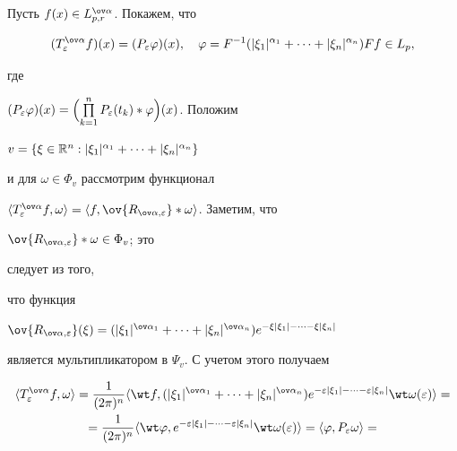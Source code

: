 \begin{pf}


Пусть $f(x)\in\spaceL$. Покажем, что


\begin{equation}


(T^{\ov\alpha}_\varepsilon f)(x)=(P_\varepsilon\varphi)(x),\quad


\varphi=F^{-1}(|\xi_1|^{\alpha_1}+\dotsb+|\xi_n|^{\alpha_n})


Ff\in L_p,


\end{equation}


где


$(P_\varepsilon\varphi)(x)=\Bigl(\prod\limits^n_{k=1}


P_\varepsilon(t_k)\ast\varphi\Bigr)(x)$. Положим


$v=\{\xi\in\Bbb R^n:|\xi_1|^{\alpha_1}+\dotsb+|\xi_n|^{\alpha_n}\}$


и для $\omega\in\Phi_v$ рассмотрим функционал


$\la T^{\ov\alpha}_\varepsilon f,\omega\ra


=\la f,\ov{R_{\ov\alpha,\varepsilon}}\ast\omega\ra$. Заметим, что


$\ov{R_{\ov\alpha,\varepsilon}}\ast\omega\in\Phi_v$; это


следует из того,


что функция


$\ov{R_{\ov\alpha,\varepsilon}}(\xi)=


(|\xi_1|^{\ov\alpha_1}+\dotsb+|\xi_n|^{\ov\alpha_n})


e^{-\xi|\xi_1|-\dotsb-\xi|\xi_n|}$


является мультипликатором в $\Psi_v$. С учетом этого получаем


\begin{gather*}


\la T^{\ov\alpha}_\varepsilon f,\omega\ra=\frac{1}{(2\pi)^n}


\la\wt f,(|\xi_1|^{\ov\alpha_1}+\dotsb+|\xi_n|^{\ov\alpha_n})


e^{-\varepsilon|\xi_1|-\dotsb-\varepsilon|\xi_n|}


\wt\omega(\varepsilon)\ra= \\


=\frac{1}{(2\pi)^n}\la\wt\varphi,


e^{-\varepsilon|\xi_1|-\dotsb-\varepsilon|\xi_n|}


\wt\omega(\varepsilon)\ra=


\la\varphi,P_\varepsilon\omega\ra =



\end{gather*}
\end{pf}
